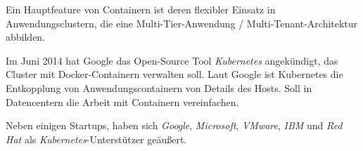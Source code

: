 \documentclass[../main.tex]{subfiles}
\begin{document}
        Ein Hauptfeature von Containern ist deren flexibler Einsatz in Anwendungsclustern, die eine Multi-Tier-Anwendung / Multi-Tenant-Architektur abbilden.

        Im Juni 2014 hat Google das Open-Source Tool \emph{Kubernetes} angekündigt, das Cluster mit Docker-Containern verwalten soll. Laut Google ist Kubernetes die Entkopplung von Anwendungscontainern von Details des Hosts.
        Soll in Datencentern die Arbeit mit Containern vereinfachen.

        Neben einigen Startups, haben sich \emph{Google}, \emph{Microsoft}, \emph{VMware}, \emph{IBM} und \emph{Red Hat} als \emph{Kubernetes}-Unterstützer geäußert.
\end{document}
